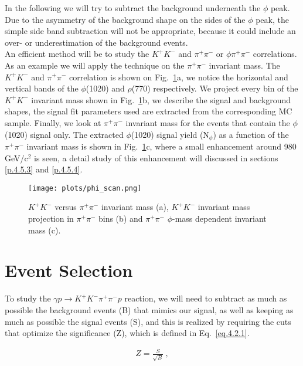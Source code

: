 \par In the following we will try to subtract the background underneath the $\phi$ peak. Due to the asymmetry of the background shape on the sides of the $\phi$ peak, the simple side band subtraction will not be appropriate, because it could include an over- or underestimation of the background events.\\
An efficient method will be to study the $K^+K^-$ and $\pi^+\pi^-$ or $\phi \pi^+ \pi^-$ correlations. As an example we will apply the technique on the $\pi^+\pi^-$ invariant mass. The $K^+K^-$ and $\pi^+\pi^-$ correlation is shown on Fig.~\ref{fig.4.4.2}a, we notice the horizontal and vertical bands of the $\phi$(1020) and $\rho$(770) respectively. We project every bin of the $K^+K^-$ invariant mass shown in Fig.~\ref{fig.4.4.2}b, we describe the signal and background shapes, the signal fit parameters used are extracted from the corresponding MC sample. Finally, we look at $\pi^+\pi^-$ invariant mass for the events that contain the $\phi$(1020) signal only. The extracted $\phi$(1020) signal yield (N$_{\phi}$) as a function of the $\pi^+\pi^-$ invariant mass is shown in Fig.~\ref{fig.4.4.2}c, where a small enhancement around 980 GeV/c$^2$ is seen, a detail study of this enhancement will discussed in sections \ref{p.4.5.3} and \ref{p.4.5.4}.

\begin{figure}[H]
    \centering
    \texttt{[image: plots/phi\_scan.png]}
    \caption{\label{fig.4.4.2}$K^+K^-$ versus $\pi^+\pi^-$ invariant mass (a), $K^+K^-$ invariant mass projection in $\pi^+\pi^-$ bins (b) and $\pi^+\pi^-$ $\phi$-mass dependent invariant mass (c).}
\end{figure}

\section{Event Selection}
\label{p.4.2}

To study the $\gamma p \rightarrow  K^+ K^- \pi^+ \pi^- p$ reaction, we will need to subtract as much as possible the background events (B) that mimics our signal, as well as keeping as much as possible the signal events (S), and this is realized by requiring the cuts that optimize the significance (Z), which is defined in Eq.~\ref{eq.4.2.1}.

\begin{equation}
    \label{eq.4.2.1}
    \begin{aligned}
        Z = \frac{S}{\sqrt{B}}~,
    \end{aligned}
\end{equation}


